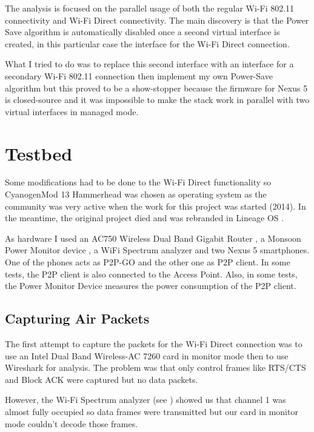 The analysis is focused on the parallel usage of both the regular Wi-Fi 802.11 connectivity and Wi-Fi Direct connectivity. The main discovery is that the Power Save algorithm is automatically disabled once a second virtual interface is created, in this particular case the interface for the Wi-Fi Direct connection. 

What I tried to do was to replace this second interface with an interface for a secondary Wi-Fi 802.11 connection then implement my own Power-Save algorithm but this proved to be a show-stopper because the firmware for Nexus 5 is closed-source and it was impossible to make the stack work in parallel with two virtual interfaces in managed mode.


\section{Testbed}
\label{sec:testbed}

Some modifications had to be done to the Wi-Fi Direct functionality so CyanogenMod 13 Hammerhead was chosen as operating system as the community was very active when the work for this project was started (2014). In the meantime, the original project died and was rebranded in Lineage OS \cite{cite-lineage}.

As hardware I used an AC750 Wireless Dual Band Gigabit Router \cite{cite-router}, a Monsoon Power Monitor device \cite{cite-monsoon}, a WiFi Spectrum analyzer and two Nexus 5 smartphones. One of the phones acts as P2P-GO and the other one as P2P client. In some tests, the P2P client is also connected to the Access Point. Also, in some tests, the Power Monitor Device measures the power consumption of the P2P client.

\subsection{Capturing Air Packets}
\label{sub-sec:proj-scopemonitormode}

The first attempt to capture the packets for the Wi-Fi Direct connection was to use an Intel Dual Band Wireless-AC 7260 card \cite{cite-intel7260} in monitor mode then to use Wireshark \cite{cite-wireshark}  for analysis. The problem was that only control frames like RTS/CTS and Block ACK were captured but no data packets.

However, the Wi-Fi Spectrum analyzer (see ) showed us that channel 1 was almost fully occupied so data frames were transmitted but our card in monitor mode couldn't decode those frames.

